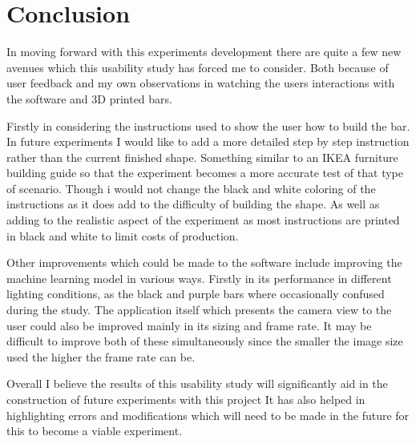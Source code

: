 \documentclass{vgtc}                          %
\begin{document}
\section{Conclusion}


In moving forward with this experiments development there are quite a few new avenues which this usability study has forced me to consider. Both because of user feedback and my own observations in watching the users interactions with the software and 3D printed bars.

Firstly in considering the instructions used to show the user how to build the bar. In future experiments I would like to add a more detailed step by step instruction rather than the current finished shape. Something similar to an IKEA furniture building guide so that the experiment becomes a more accurate test of that type of scenario. Though i would not change the black and white coloring of the instructions as it does add to the difficulty of building the shape. As well as adding to the realistic aspect of the experiment as most instructions are printed in black and white to limit costs of production.

Other improvements which could be made to the software include improving the machine learning model in various ways. Firstly in its performance in different lighting conditions, as the black and purple bars where occasionally confused during the study. The application itself which presents the camera view to the user could also be improved mainly in its sizing and frame rate. It may be difficult to improve both of these simultaneously since the smaller the image size used the higher the frame rate can be.

Overall I believe the results of this usability study will significantly aid in the construction of future experiments with this project It has also helped in highlighting errors and modifications which will need to be made in the future for this to become a viable experiment.















%

% 
%
%


\end{document}
